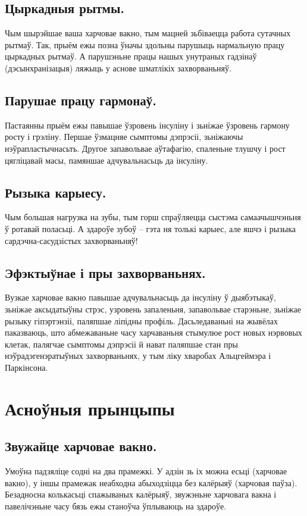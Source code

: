 \subsection{Цыркадныя рытмы.}
Чым шырэйшае ваша харчовае вакно, тым мацней зьбіваецца работа сутачных рытмаў. Так, прыём ежы позна ўначы здольны парушыць нармальную працу цыркадных рытмаў. А парушэньне працы нашых унутраных гадзінаў (дэсынхранізацыя) ляжыць у аснове шматлікіх захворваньняў.

\subsection{Парушае працу гармонаў.}
Пастаянны прыём ежы павышае ўзровень інсуліну і зьніжае ўзровень гармону росту і грэліну. Першае ўзмацняе сымптомы дэпрэсіі, зьніжаючы нэўрапластычнасьть. Другое запавольвае аўтафагію, спаленьне тлушчу і рост цягліцавай масы, памяншае адчувальнасьць да інсуліну.

\subsection{Рызыка карыесу.}
Чым большая нагрузка на зубы, тым горш спраўляецца сыстэма самаачышчэньня ў ротавай поласьці. А здароўе зубоў – гэта ня толькі карыес, але яшчэ і рызыка сардэчна-сасудзістых захворваньняў!

\subsection{Эфэктыўнае і пры захворваньнях.}
Вузкае харчовае вакно павышае адчувальнасьць да інсуліну ў дыябэтыкаў, зьніжае аксыдатыўны стрэс, узровень запаленьня, запавольвае старэньне, зьніжае рызыку гіпэртэнзіі, паляпшае ліпідны профіль. Дасьледаваньні на жывёлах паказваюць, што абмежаваньне часу харчаваньня стымулюе рост новых нэрвовых клетак, палягчае сымптомы дэпрэсіі й нават паляпшае стан пры нэўрадэгенэратыўных захворваньнях, у тым ліку хваробах Альцгеймэра і Паркінсона.

\section{Асноўныя прынцыпы}

\subsection{Звужайце харчовае вакно.}
Умоўна падзяліце содні на два прамежкі. У адзін зь іх можна есьці (харчовае вакно), у іншы прамежак неабходна абыходзіцца без калёрыяў (харчовая паўза). Безадносна колькасьці спажываных калёрыяў, звужэньне харчовага вакна і павелічэньне часу бязь ежы станоўча ўплываюць на здароўе.

